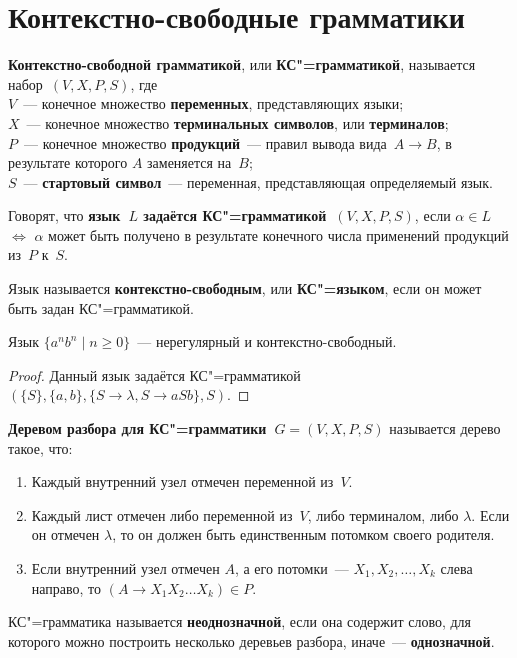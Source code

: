 \section{Контекстно-свободные грамматики}
  \textbf{Контекстно-свободной грамматикой}, или \textbf{КС"=грамматикой}, называется набор~$(V, X, P, S)$, где\\
$V$~--- конечное множество \textbf{переменных}, представляющих языки;\\
$X$~--- конечное множество \textbf{терминальных символов}, или \textbf{терминалов};\\
$P$~--- конечное множество \textbf{продукций}~--- правил вывода вида~$A \to B$, в результате которого $A$ заменяется на~$B$;\\
$S$~--- \textbf{стартовый символ}~--- переменная, представляющая определяемый язык.

Говорят, что \textbf{язык~$L$ задаётся КС"=грамматикой~$(V, X, P, S)$}, если $\alpha \in L$ $\Leftrightarrow$ $\alpha$ может быть получено в результате конечного числа применений продукций из~$P$ к~$S$.

 Язык называется \textbf{контекстно-свободным}, или \textbf{КС"=языком}, если он может быть задан КС"=грамматикой.

\begin{theorem}
Язык $\{ a^n b^n \mid n \geqslant 0 \}$~--- нерегулярный и контекстно-свободный.
\end{theorem}
\begin{proof}
Данный язык задаётся КС"=грамматикой~$(\{ S \}, \{ a, b \}, \{ S \to \lambda, S \to aSb \}, S)$.
\end{proof}

\textbf{Деревом разбора для КС"=грамматики~$G = (V, X, P, S)$} называется дерево такое, что:
\begin{enumerate}
	\item Каждый внутренний узел отмечен переменной из~$V$.
	\item Каждый лист отмечен либо переменной из~$V$, либо терминалом, либо $\lambda$.
	Если он отмечен $\lambda$, то он должен быть единственным потомком своего родителя.
	\item Если внутренний узел отмечен $A$, а его потомки~--- $X_1, X_2, \ldots, X_k$ слева направо, то $(A \to X_1 X_2 \ldots X_k) \in P$.
\end{enumerate}

КС"=грамматика называется \textbf{неоднозначной}, если она содержит слово, для которого можно построить несколько деревьев разбора, иначе~--- \textbf{однозначной}.

